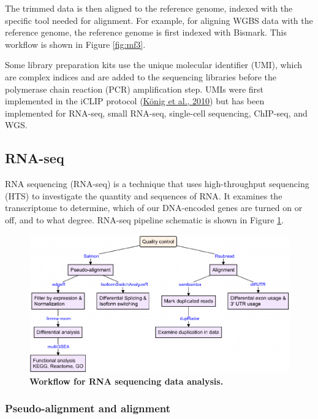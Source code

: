 \documentclass[12pt,twoside]{reedthesis}
\begin{document}
The trimmed data is then aligned to the reference genome, indexed with
the specific tool needed for alignment. For example, for aligning WGBS
data with the reference genome, the reference genome is first indexed
with Bismark. This workflow is shown in Figure \ref{fig:mf3}.

Some library preparation kits use the unique molecular identifier (UMI),
which are complex indices and are added to the sequencing libraries
before the polymerase chain reaction (PCR) amplification step. UMIs were
first implemented in the iCLIP protocol (\protect\hyperlink{ref-kuxf6nig2010}{König et al., 2010}) but has been
implemented for RNA-seq, small RNA-seq, single-cell sequencing,
ChIP-seq, and WGS.

\hypertarget{m3.2}{%
\subsection*{RNA-seq}\label{m3.2}}

RNA sequencing (RNA-seq) is a technique that uses high-throughput
sequencing (HTS) to investigate the quantity and sequences of RNA. It
examines the transcriptome to determine, which of our DNA-encoded genes
are turned on or off, and to what degree. RNA-seq pipeline schematic is
shown in Figure \ref{fig:mf4}.


\begin{figure}[h]

{\centering \includegraphics{thesis_files/figure-latex/mf4-1} 

}

\caption[Workflow for RNA sequencing data analysis]{\textbf{Workflow for RNA sequencing data analysis.}}\label{fig:mf4}
\end{figure}
\hypertarget{m3.2.1}{%
\subsubsection*{Pseudo-alignment and alignment}\label{m3.2.1}}
\end{document}

